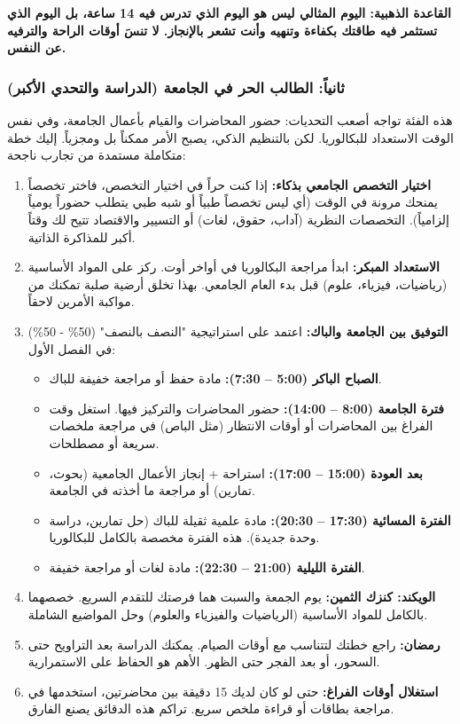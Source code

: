 \documentclass[12pt,a4paper]{book}
\newcommand{\importantAr}[1]{%
	\begin{important}
		\bfseries #1
	\end{important}
}
\begin{document}
	\importantAr{القاعدة الذهبية: اليوم المثالي ليس هو اليوم الذي تدرس فيه 14 ساعة، بل اليوم الذي تستثمر فيه طاقتك بكفاءة وتنهيه وأنت تشعر بالإنجاز. لا تنسَ أوقات الراحة والترفيه عن النفس.}
	
	\subsubsection{ثانياً: الطالب الحر في الجامعة (الدراسة والتحدي الأكبر)}
	\label{sec:free-candidate-advice}
	هذه الفئة تواجه أصعب التحديات: حضور المحاضرات والقيام بأعمال الجامعة، وفي نفس الوقت الاستعداد للبكالوريا. لكن بالتنظيم الذكي، يصبح الأمر ممكناً بل ومجزياً. إليك خطة متكاملة مستمدة من تجارب ناجحة:
	
	\begin{enumerate}
		\item \textbf{اختيار التخصص الجامعي بذكاء:} إذا كنت حراً في اختيار التخصص، فاختر تخصصاً يمنحك مرونة في الوقت (أي ليس تخصصاً طبياً أو شبه طبي يتطلب حضوراً يومياً إلزامياً). التخصصات النظرية (آداب، حقوق، لغات) أو التسيير والاقتصاد تتيح لك وقتاً أكبر للمذاكرة الذاتية.
		\item \textbf{الاستعداد المبكر:} ابدأ مراجعة البكالوريا في أواخر أوت. ركز على المواد الأساسية (رياضيات، فيزياء، علوم) قبل بدء العام الجامعي. بهذا تخلق أرضية صلبة تمكنك من مواكبة الأمرين لاحقاً.
		\item \textbf{التوفيق بين الجامعة والباك:} اعتمد على استراتيجية "النصف بالنصف" (50\% - 50\%) في الفصل الأول:
		\begin{itemize}
			\item \textbf{الصباح الباكر (5:00 – 7:30):} مادة حفظ أو مراجعة خفيفة للباك.
			\item \textbf{فترة الجامعة (8:00 – 14:00):} حضور المحاضرات والتركيز فيها. استغل وقت الفراغ بين المحاضرات أو أوقات الانتظار (مثل الباص) في مراجعة ملخصات سريعة أو مصطلحات.
			\item \textbf{بعد العودة (15:00 – 17:00):} استراحة + إنجاز الأعمال الجامعية (بحوث، تمارين) أو مراجعة ما أخذته في الجامعة.
			\item \textbf{الفترة المسائية (17:30 – 20:30):} مادة علمية ثقيلة للباك (حل تمارين، دراسة وحدة جديدة). هذه الفترة مخصصة بالكامل للبكالوريا.
			\item \textbf{الفترة الليلية (21:00 – 22:30):} مادة لغات أو مراجعة خفيفة.
		\end{itemize}
		\item \textbf{الويكند: كنزك الثمين:} يوم الجمعة والسبت هما فرصتك للتقدم السريع. خصصهما بالكامل للمواد الأساسية (الرياضيات والفيزياء والعلوم) وحل المواضيع الشاملة.
		\item \textbf{رمضان:} راجع خطتك لتتناسب مع أوقات الصيام. يمكنك الدراسة بعد التراويح حتى السحور، أو بعد الفجر حتى الظهر. الأهم هو الحفاظ على الاستمرارية.
			\item \textbf{استغلال أوقات الفراغ:} حتى لو كان لديك 15 دقيقة بين محاضرتين، استخدمها في مراجعة بطاقات  أو قراءة ملخص سريع. تراكم هذه الدقائق يصنع الفارق.
	\end{enumerate}
	
\end{document}
